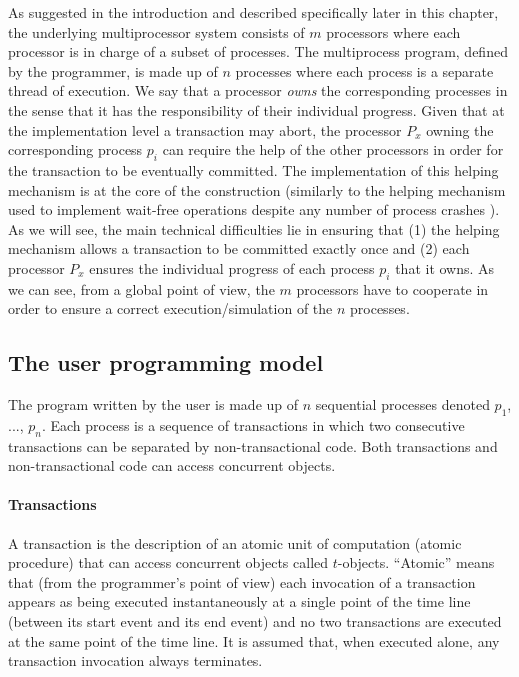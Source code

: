 As suggested in the introduction and described specifically later in this chapter,
the underlying multiprocessor system  consists of 
$m$  processors where each processor is in charge  of a  subset of  processes.
The  multiprocess program, defined  by the  programmer, is  made up  of $n$
processes  where each process is a separate thread of execution.
 We say that a processor {\it owns}
the corresponding processes in the sense that  it has the responsibility 
of their individual   progress.  Given that at  the implementation level
a  transaction may abort, the processor $P_x$ owning the corresponding 
process $p_i$ can  require the help of  the other  processors  
in order for the transaction to be eventually committed. 
The  implementation of this  helping mechanism  is at the core of the 
construction  (similarly to the helping mechanism used  to implement 
wait-free operations despite any number of process crashes \cite{H91}). 
As we  will  see, the  main technical difficulties  lie  in   ensuring that 
(1) the helping  mechanism  allows   a transaction to be committed  exactly
once and (2) each processor $P_x$ ensures the individual progress  of  each 
process $p_i$ that it owns. As we can see, from a global point of view,
the  $m$ processors have to    cooperate in order to ensure a correct
execution/simulation of the $n$  processes. 


\subsection{The  user programming model}

The program written by the user is made up of $n$ sequential processes
denoted $p_1$, ..., $p_n$. Each process is a sequence of transactions 
in which two consecutive transactions can be separated by non-transactional 
code. Both transactions and  non-transactional code can access concurrent 
objects.

\paragraph{Transactions}
A transaction is the description of an atomic unit of computation 
(atomic procedure) that can access concurrent objects called $t$-objects. 
``Atomic'' means that (from the programmer's point of view) each 
invocation of a transaction appears as being executed 
instantaneously at a single point of  the time line (between its start event
and its end event) and no two transactions are executed at the same point 
of the time line.  It is  assumed that, when executed alone, 
any  transaction  invocation always terminates.  

